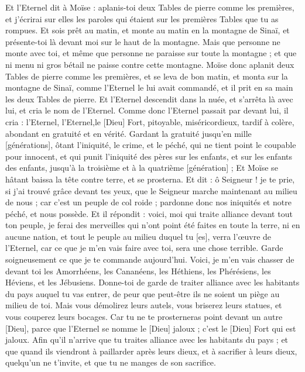 \begin{multicols}{2}
\VerseOne{}Et l'Eternel dit à Moïse : aplanis-toi deux Tables de pierre comme les premières, et j'écrirai sur elles les paroles qui étaient sur les premières Tables que tu as rompues.
Et sois prêt au matin, et monte au matin en la montagne de Sinaï, et présente-toi là devant moi sur le haut de la montagne.
Mais que personne ne monte avec toi, et même que personne ne paraisse sur toute la montagne ; et que ni menu ni gros bétail ne paisse contre cette montagne.
Moïse donc aplanit deux Tables de pierre comme les premières, et se leva de bon matin, et monta sur la montagne de Sinaï, comme l'Eternel le lui avait commandé, et il prit en sa main les deux Tables de pierre.
Et l'Eternel descendit dans la nuée, et s'arrêta là avec lui, et cria le nom de l'Eternel.
Comme donc l'Eternel passait par devant lui, il cria : l'Eternel, l'Eternel,le [Dieu] Fort, pitoyable, miséricordieux, tardif à colère, abondant en gratuité et en vérité.
Gardant la gratuité jusqu’en mille [générations], ôtant l'iniquité, le crime, et le péché, qui ne tient point le coupable pour innocent, et qui punit l'iniquité des pères sur les enfants, et sur les enfants des enfants, jusqu’à la troisième et à la quatrième [génération] ;
Et Moïse se hâtant baissa la tête contre terre, et se prosterna.
Et dit : ô Seigneur ! je te prie, si j'ai trouvé grâce devant tes yeux, que le Seigneur marche maintenant au milieu de nous ; car c'est un peuple de col roide ; pardonne donc nos iniquités et notre péché, et nous possède.
Et il répondit : voici, moi qui traite alliance devant tout ton peuple, je ferai des merveilles qui n'ont point été faites en toute la terre, ni en aucune nation, et tout le peuple au milieu duquel tu [es], verra l'œuvre de l'Eternel, car ce que je m'en vais faire avec toi, sera une chose terrible.
Garde soigneusement ce que je te commande aujourd'hui. Voici, je m'en vais chasser de devant toi les Amorrhéens, les Cananéens, les Héthiens, les Phérésiens, les Héviens, et les Jébusiens.
Donne-toi de garde de traiter alliance avec les habitants du pays auquel tu vas entrer, de peur que peut-être ils ne soient un piège au milieu de toi.
Mais vous démolirez leurs autels, vous briserez leurs statues, et vous couperez leurs bocages.
Car tu ne te prosterneras point devant un autre [Dieu], parce que l'Eternel se nomme le [Dieu] jaloux ; c'est le [Dieu] Fort qui est jaloux.
Afin qu'il n'arrive que tu traites alliance avec les habitants du pays ; et que quand ils viendront à paillarder après leurs dieux, et à sacrifier à leurs dieux, quelqu'un ne t'invite, et que tu ne manges de son sacrifice.

\end{multicols}
